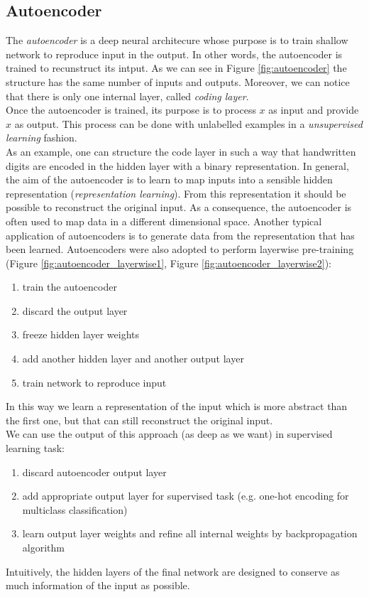 \subsection{Autoencoder}
The \textit{autoencoder} is a deep neural architecure whose purpose is to train
shallow network to reproduce input in the output. In other words, the
autoencoder is trained to recunstruct its intput. As we can see in Figure \ref{fig:autoencoder}
the structure has the same number of inputs and outputs. Moreover, we can notice
that there is only one internal layer, called \textit{coding layer}. \\ Once the
autoencoder is trained, its purpose is to process $x$ as input and provide $x$ as
output. This process can be done with unlabelled examples in a \textit{unsupervised
learning} fashion.\\ As an example, one can structure the code layer in such a
way that handwritten digits are encoded in the hidden layer with a binary
representation. In general, the aim of the autoencoder is to learn to map inputs
into a sensible hidden representation (\textit{representation learning}). From
this representation it should be possible to reconstruct the original input. As a
consequence, the autoencoder is often used to map data in a different
dimensional space. Another typical application of autoencoders is to generate data
from the representation that has been learned. Autoencoders were also adopted to
perform layerwise pre-training (Figure \ref{fig:autoencoder_layerwise1}, Figure
\ref{fig:autoencoder_layerwise2}):
\begin{enumerate}
	\item train the autoencoder

	\item discard the output layer

	\item freeze hidden layer weights

	\item add another hidden layer and another output layer

	\item train network to reproduce input
\end{enumerate}
In this way we learn a representation of the input which is more abstract than
the first one, but that can still reconstruct the original input. \\ We can use
the output of this approach (as deep as we want) in supervised learning task:
\begin{enumerate}
	\item discard autoencoder output layer

	\item add appropriate output layer for supervised task (e.g. one-hot encoding for
		multiclass classification)

	\item learn output layer weights and refine all internal weights by backpropagation
		algorithm
\end{enumerate}
Intuitively, the hidden layers of the final network are designed to conserve as
much information of the input as possible.
\newline

